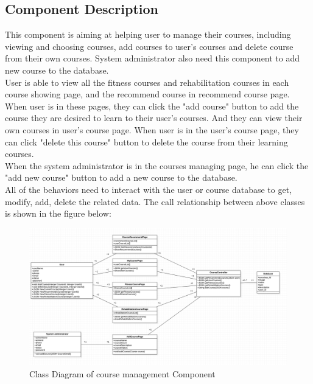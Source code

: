 \documentclass[16pt]{scrreprt}
\begin{document}
\subsection{Component Description}
This component is aiming at helping user to manage their courses, including viewing and choosing courses, add courses to user's courses and delete course from their own courses. System administrator also need this component to add new course to the database.\\

\noindent User is able to view all the fitness courses and rehabilitation courses in each course showing page, and the recommend course in recommend course page. When user is in these pages, they can click the "add course" button to add the course they are desired to learn to their user's courses. And they can view their own courses in user's course page. When user is in the user's course page, they can click "delete this course" button to delete the course from their learning courses.\\

\noindent When the system administrator is in the courses managing page, he can click the "add new course" button to add a new course to the database.\\

\noindent All of the behaviors need to interact with the user or course database to get, modify, add, delete the related data. The call relationship between above classes is shown in the figure below:
\begin{figure}[H]
    \centering
    \includegraphics[width=1.0\textwidth]{diagrams/course-module-diagram.png}
    \caption{Class Diagram of course management Component}
\end{figure}
\end{document}
